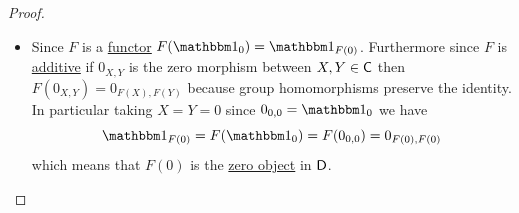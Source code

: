 \documentclass[../../main]{subfiles}
\begin{document}
\begin{proof}~
  \begin{itemize}
    \item[\(\implies\)] Since \(F\) is a \hyperref[def:functor]{functor} \(F(\id_{0}) = \id_{F(0)}\).
          Furthermore since \(F\) is \hyperref[def:additive-functor]{additive} if \(0_{X, Y}\) is the zero morphism between \(X, Y \in \mathsf{C}\) then \(F(0_{X, Y}) = 0_{F(X), F(Y)}\) because group homomorphisms preserve the identity.
          In particular taking \(X = Y = 0\) since \(0_{0, 0} = \id_{0}\) we have
          \begin{equation*}
            \id_{F(0)} = F(\id_{0}) = F(0_{0, 0}) = 0_{F(0), F(0)}
          \end{equation*}
          which means that \(F(0)\) is the \hyperref[def:zero-object]{zero object} in \(\mathsf{D}\).
          

\end{itemize}
\end{proof}
\end{document}
